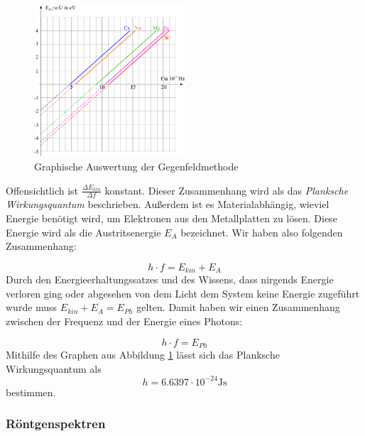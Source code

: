 \documentclass[a4paper]{article}
\begin{document}
				\begin{figure}[H]
					\centering
					\includegraphics[width=0.5\textwidth]{img/wirkungsquantum01_quantenobjektp_ver.png}
					\caption{Graphische Auswertung der Gegenfeldmethode}
					\label{img:wirkungsquantum01_quantenobjektp_ver}
				\end{figure}
				\noindent Offensichtlich ist $\frac{\Delta E_{kin}}{\Delta f}$ konstant. Dieser Zusammenhang wird als das \textit{Planksche Wirkungsquantum} beschrieben. Außerdem ist es Materialabhängig, wieviel Energie benötigt wird, um Elektronen aus den Metallplatten zu lösen. Diese Energie wird als die Austritsenergie $E_A$ bezeichnet. Wir haben also folgenden Zusammenhang:
				
				\begin{equation}
					h\cdot f=E_{kin}+ E_A
				\end{equation}
				Durch den Energieerhaltungssatzes und des Wissens, dass nirgends Energie verloren ging oder abgesehen von dem Licht dem System keine Energie zugeführt wurde muss $E_{kin}+ E_A=E_{Ph}$ gelten. Damit haben wir einen Zusammenhang zwischen der Frequenz und der Energie eines Photons:
				
				\begin{equation}
				h\cdot f=E_{Ph}
				\end{equation}
				Mithilfe des Graphen aus Abbildung \ref{img:wirkungsquantum01_quantenobjektp_ver} lässt sich das Planksche Wirkungsquantum als
				\begin{equation}
				h = 6.6397 \cdot 10^{-24} \si{\joule\second}
				\end{equation}
				bestimmen.
				
				
			
			\subsubsection{Röntgenspektren}
			
\end{document}
